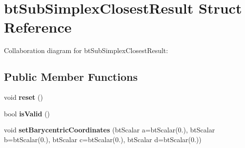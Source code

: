 \hypertarget{structbt_sub_simplex_closest_result}{\section{bt\+Sub\+Simplex\+Closest\+Result Struct Reference}
\label{structbt_sub_simplex_closest_result}
}


Collaboration diagram for bt\+Sub\+Simplex\+Closest\+Result\+:
\subsection*{Public Member Functions}
\begin{DoxyCompactItemize}
\item 
\hypertarget{structbt_sub_simplex_closest_result_a3c7307b4ee6bbfa030b104cccb2e5e2c}{void {\bfseries reset} ()}\label{structbt_sub_simplex_closest_result_a3c7307b4ee6bbfa030b104cccb2e5e2c}

\item 
\hypertarget{structbt_sub_simplex_closest_result_a2b878f6f62b458c276368074e63ddad8}{bool {\bfseries is\+Valid} ()}\label{structbt_sub_simplex_closest_result_a2b878f6f62b458c276368074e63ddad8}

\item 
\hypertarget{structbt_sub_simplex_closest_result_a4cd8e4b562ba07ad684e9df51e2f1910}{void {\bfseries set\+Barycentric\+Coordinates} (bt\+Scalar a=bt\+Scalar(0.), bt\+Scalar b=bt\+Scalar(0.), bt\+Scalar c=bt\+Scalar(0.), bt\+Scalar d=bt\+Scalar(0.))}\label{structbt_sub_simplex_closest_result_a4cd8e4b562ba07ad684e9df51e2f1910}

\end{DoxyCompactItemize}
